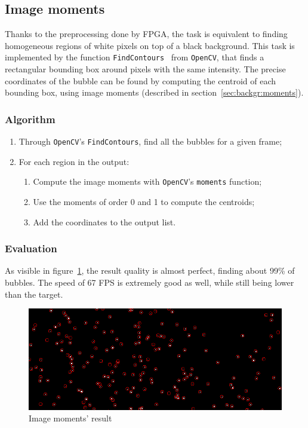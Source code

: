 \subsection{Image moments}

Thanks to the preprocessing done by FPGA, the \locate* task is equivalent to finding homogeneous regions of white pixels on top of a black background.
This task is implemented by the function \texttt{FindContours}~\cite{findcontours} from \texttt{OpenCV}, that finds a rectangular bounding box around pixels with the same intensity.
The precise coordinates of the bubble can be found by computing the centroid of each bounding box, using image moments (described in section~\ref{sec:backgr:moments}).

\subsubsection{Algorithm}

\begin{enumerate}
	\itemsep 0em
	\item Through \texttt{OpenCV}'s \texttt{FindContours}, find all the bubbles for a given frame;
	\item For each region in the output:
	      \begin{enumerate}
		      \item Compute the image moments with \texttt{OpenCV}'s \texttt{moments} function;
		      \item Use the moments of order 0 and 1 to compute the centroids;
		      \item Add the coordinates to the output list.
	      \end{enumerate}
\end{enumerate}

\subsubsection{Evaluation}

As visible in figure~\ref{fig:locate:moments}, the result quality is almost perfect, finding about 99\% of bubbles.
The speed of 67 FPS is extremely good as well, while still being lower than the target.

\begin{figure}
	\centerline{\includegraphics[width=\locateimgsize]{images/locate/opencv moments.png}}
	\caption{\centering Image moments' result}
	\label{fig:locate:moments}
\end{figure}
